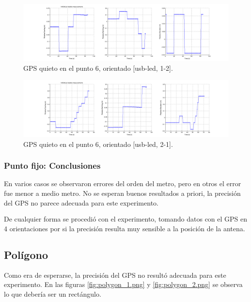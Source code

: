 \documentclass[spanish,12pt,a4paper,titlepage]{report}
\begin{document}
\begin{figure}[h!]
  \hspace{-70pt}
  \includegraphics[width=1.3\textwidth]{./img/log_06_individual.png}
  \caption{GPS quieto en el punto 6, orientado [usb-led, 1-2].}
  \label{fig:log_06_individual.png}
\end{figure}

\newpage

\begin{figure}[h!]
  \hspace{-70pt}
  \includegraphics[width=1.3\textwidth]{./img/log_05_individual.png}
  \caption{GPS quieto en el punto 6, orientado [usb-led, 2-1].}
  \label{fig:log_05_individual.png}
\end{figure}

\subsubsection{Punto fijo: Conclusiones}
\label{sec:punto-fijo-conclusiones}

En varios casos se observaron errores del orden del metro, pero en otros el error fue menor a medio metro. No se esperan buenos resultados a priori, la precisión del GPS no parece adecuada para este experimento.

De cualquier forma se procedió con el experimento, tomando datos con el GPS en 4 orientaciones por si la precisión resulta muy sensible a la posición de la antena.

\newpage
\subsection{Polígono}
\label{sec:poligono}

Como era de esperarse, la precisión del GPS no resultó adecuada para este experimento. En las figuras \ref{fig:polygon_1.png} y \ref{fig:polygon_2.png} se observa lo que debería ser un rectángulo.
\end{document}
